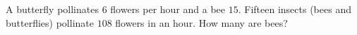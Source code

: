 A butterfly pollinates $6$ flowers per hour and a bee $15$. Fifteen insects (bees and butterflies) pollinate $108$ flowers in an hour. How many are bees?
